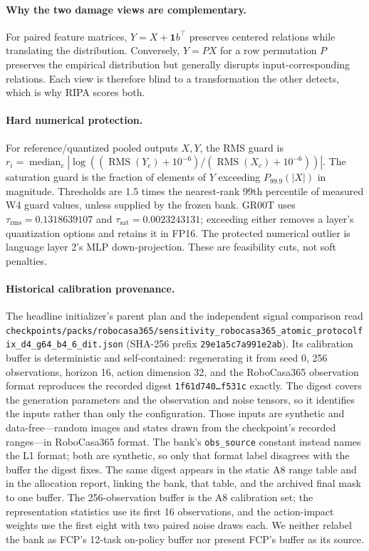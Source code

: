 \paragraph{Why the two damage views are complementary.}
For paired feature matrices, $Y=X+\mathbf{1}b^\top$ preserves centered relations while translating the distribution. Conversely, $Y=PX$ for a row permutation $P$ preserves the empirical distribution but generally disrupts input-corresponding relations. Each view is therefore blind to a transformation the other detects, which is why RIPA scores both.

\paragraph{Hard numerical protection.}
For reference/quantized pooled outputs $X,Y$, the RMS guard is $r_i=\operatorname{median}_c|\log((\operatorname{RMS}(Y_c)+10^{-6})/(\operatorname{RMS}(X_c)+10^{-6}))|$. The saturation guard is the fraction of elements of $Y$ exceeding $P_{99.9}(|X|)$ in magnitude. Thresholds are 1.5 times the nearest-rank 99th percentile of measured W4 guard values, unless supplied by the frozen bank. GR00T uses $\tau_{\mathrm{rms}}=0.1318639107$ and $\tau_{\mathrm{sat}}=0.0023243131$; exceeding either removes a layer's quantization options and retains it in FP16. The protected numerical outlier is language layer 2's MLP down-projection. These are feasibility cuts, not soft penalties.

\paragraph{Historical calibration provenance.}
The headline initializer's parent plan and the independent signal comparison read \nolinkurl{checkpoints/packs/robocasa365/sensitivity_robocasa365_atomic_protocolfix_d4_g64_b4_6_dit.json} (SHA-256 prefix \texttt{29e1a5c7a991e2ab}). Its calibration buffer is deterministic and self-contained: regenerating it from seed 0, 256 observations, horizon 16, action dimension 32, and the RoboCasa365 observation format reproduces the recorded digest \texttt{1f61d740\ldots f531c} exactly. The digest covers the generation parameters and the observation and noise tensors, so it identifies the inputs rather than only the configuration. Those inputs are synthetic and data-free---random images and states drawn from the checkpoint's recorded ranges---in RoboCasa365 format. The bank's \texttt{obs\_source} constant instead names the L1 format; both are synthetic, so only that format label disagrees with the buffer the digest fixes. The same digest appears in the static A8 range table and in the allocation report, linking the bank, that table, and the archived final mask to one buffer. The 256-observation buffer is the A8 calibration set; the representation statistics use its first 16 observations, and the action-impact weights use the first eight with two paired noise draws each. We neither relabel the bank as FCP's 12-task on-policy buffer nor present FCP's buffer as its source.

